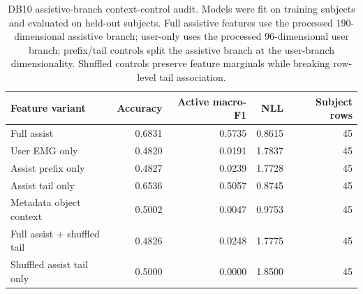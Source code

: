 \begin{table}[!t]
\centering
\caption{DB10 assistive-branch context-control audit. Models were fit on training subjects and evaluated on held-out subjects. Full assistive features use the processed 190-dimensional assistive branch; user-only uses the processed 96-dimensional user branch; prefix/tail controls split the assistive branch at the user-branch dimensionality. Shuffled controls preserve feature marginals while breaking row-level tail association.}
\label{tab:db10-context-control}
\scriptsize
\setlength{\tabcolsep}{5pt}
\begin{tabular}{lrrrr}
\toprule
Feature variant & Accuracy & Active macro-F1 & NLL & Subject rows \\
\midrule
Full assist & 0.6831 & 0.5735 & 0.8615 & 45 \\
User EMG only & 0.4820 & 0.0191 & 1.7837 & 45 \\
Assist prefix only & 0.4827 & 0.0239 & 1.7728 & 45 \\
Assist tail only & 0.6536 & 0.5057 & 0.8745 & 45 \\
Metadata object context & 0.5002 & 0.0047 & 0.9753 & 45 \\
Full assist + shuffled tail & 0.4826 & 0.0248 & 1.7775 & 45 \\
Shuffled assist tail only & 0.5000 & 0.0000 & 1.8500 & 45 \\
\bottomrule
\end{tabular}
\end{table}
